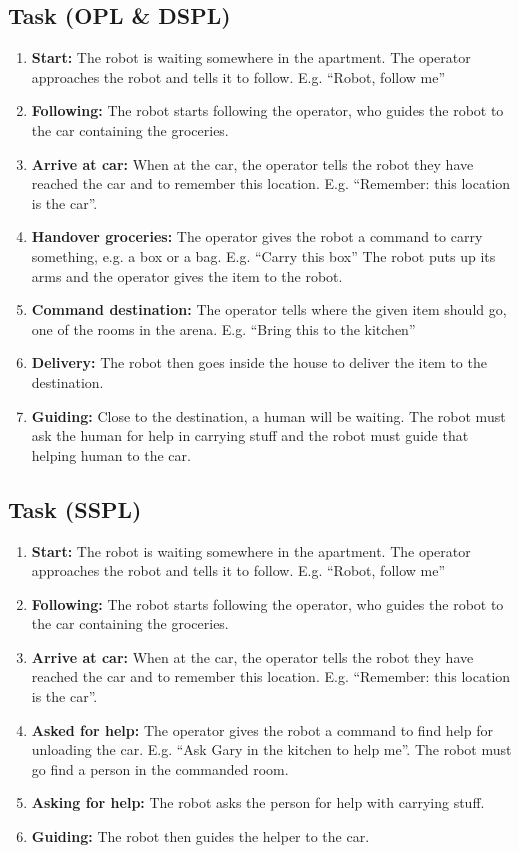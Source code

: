\subsection{Task (OPL \& DSPL)}
\begin{enumerate}
\item \textbf{Start:} The robot is waiting somewhere in the apartment. The operator approaches the robot and tells it to follow. E.g. ``Robot, follow me''
\item \textbf{Following:} The robot starts following the operator, who guides the robot to the car containing the groceries. 
\item \textbf{Arrive at car:} When at the car, the operator tells the robot they have reached the car and to remember this location. E.g. ``Remember: this location is the car''. 
\item \textbf{Handover groceries:} The operator gives the robot a command to carry something, e.g. a box or a bag.  E.g. ``Carry this box''
  The robot puts up its arms and the operator gives the item to the robot.
\item \textbf{Command destination:} The operator tells where the given item should go, one of the rooms in the arena. E.g. ``Bring this to the kitchen''
\item \textbf{Delivery:} The robot then goes inside the house to deliver the item to the destination. 
\item \textbf{Guiding:} Close to the destination, a human will be waiting. The robot must ask the human for help in carrying stuff and the robot must guide that helping human to the car.
\end{enumerate}

\subsection{Task (SSPL)}
\begin{enumerate}
	\item \textbf{Start:} The robot is waiting somewhere in the apartment. The operator approaches the robot and tells it to follow. E.g. ``Robot, follow me''
	\item \textbf{Following:} The robot starts following the operator, who guides the robot to the car containing the groceries. 
	\item \textbf{Arrive at car:} When at the car, the operator tells the robot they have reached the car and to remember this location. E.g. ``Remember: this location is the car''. 
	\item \textbf{Asked for help:} The operator gives the robot a command to find help for unloading the car.  E.g. ``Ask Gary in the kitchen to help me''.
	The robot must go find a person in the commanded room. 
	\item \textbf{Asking for help:} The robot asks the person for help with carrying stuff.
	\item \textbf{Guiding:} The robot then guides the helper to the car.
\end{enumerate}


